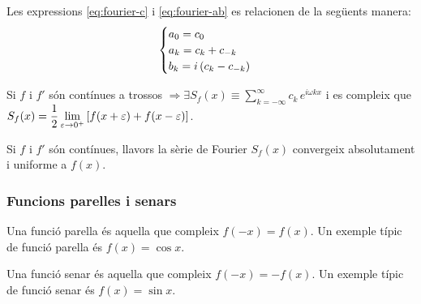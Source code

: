Les expressions \eqref{eq:fourier-c} i \eqref{eq:fourier-ab} es relacionen de la següents manera:
\begin{align*}
    \begin{cases}
        a_{0} = c_{0} \\
        a_{k} = c_{k} + c_{-k} \\
        b_{k} = i\left( c_{k} - c_{-k} \right)
    \end{cases}
\end{align*}

\begin{thm}
    Si $f$ i $f'$ són contínues a trossos $\Rightarrow \exists \displaystyle S_{f}(x) \equiv \sum_{k=-\infty}^{\infty} c_{k}\,e^{i\omega k x}$ i es compleix que $S_{f}(x) = \displaystyle \frac{1}{2} \lim_{\varepsilon \to 0^{+}} \left[ f(x + \varepsilon) + f(x - \varepsilon) \right]$.
    
    Si $f$ i $f'$ són contínues, llavors la sèrie de Fourier $S_{f}(x)$ convergeix absolutament i uniforme a $f(x)$.
\end{thm}

\subsubsection*{Funcions parelles i senars}
\begin{defi}
    Una funció parella és aquella que compleix $f(-x) = f(x)$. Un exemple típic de funció parella és $f(x) = \cos x$.
\end{defi}

\begin{defi}
    Una funció senar és aquella que compleix $f(-x) = -f(x)$. Un exemple típic de funció senar és $f(x) = \sin x$.
\end{defi}

